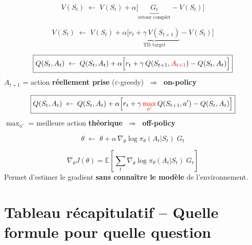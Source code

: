 \documentclass[11pt,a4paper]{article}
\newcommand{\E}{\mathbb{E}}
\begin{document}
\begin{formbox}
$$V(S_t) \;\leftarrow\; V(S_t) + \alpha \Big[\underbrace{G_t}_{\text{retour complet}} - V(S_t)\Big]$$
\end{formbox}

\begin{formbox}
$$V(S_t) \;\leftarrow\; V(S_t) + \alpha \Big[\underbrace{r_t + \gamma \, V(S_{t+1})}_{\text{TD target}} - V(S_t)\Big]$$
\end{formbox}

\begin{formbox}
$$\boxed{Q(S_t, A_t) \;\leftarrow\; Q(S_t, A_t) + \alpha \Big[r_t + \gamma \, Q(S_{t+1}, \textcolor{red}{A_{t+1}}) - Q(S_t, A_t)\Big]}$$
$A_{t+1}$ = action \textbf{réellement prise} ($\varepsilon$-greedy) $\;\Rightarrow\;$ \textbf{on-policy}
\end{formbox}

\begin{formbox}
$$\boxed{Q(S_t, A_t) \;\leftarrow\; Q(S_t, A_t) + \alpha \Big[r_t + \gamma \, \textcolor{red}{\max_{a'}} \, Q(S_{t+1}, a') - Q(S_t, A_t)\Big]}$$
$\max_{a'}$ = meilleure action \textbf{théorique} $\;\Rightarrow\;$ \textbf{off-policy}
\end{formbox}

\begin{formbox}
$$\theta \;\leftarrow\; \theta + \alpha \, \nabla_\theta \log \pi_\theta(A_t | S_t) \; G_t$$
\end{formbox}

\begin{formbox}
$$\boxed{\nabla_\theta J(\theta) = \E\left[\sum_t \nabla_\theta \log \pi_\theta(A_t | S_t) \; G_t\right]}$$
Permet d'estimer le gradient \textbf{sans connaître le modèle} de l'environnement.
\end{formbox}

\section{Tableau récapitulatif -- Quelle formule pour quelle question}
\end{document}
